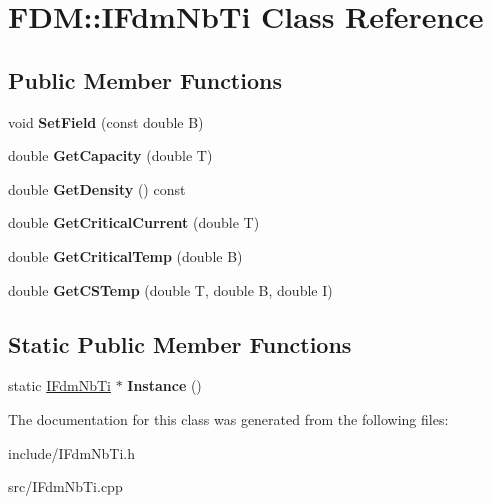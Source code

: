 \hypertarget{class_f_d_m_1_1_i_fdm_nb_ti}{}\section{F\+D\+M\+:\+:I\+Fdm\+Nb\+Ti Class Reference}
\label{class_f_d_m_1_1_i_fdm_nb_ti}
\subsection*{Public Member Functions}
\begin{DoxyCompactItemize}
\item 
\hypertarget{class_f_d_m_1_1_i_fdm_nb_ti_a0a0524a01f02076c36bc751476ee6f0e}{}void {\bfseries Set\+Field} (const double B)\label{class_f_d_m_1_1_i_fdm_nb_ti_a0a0524a01f02076c36bc751476ee6f0e}

\item 
\hypertarget{class_f_d_m_1_1_i_fdm_nb_ti_aa42e8da2ee225cdaebdc315004f35f4c}{}double {\bfseries Get\+Capacity} (double T)\label{class_f_d_m_1_1_i_fdm_nb_ti_aa42e8da2ee225cdaebdc315004f35f4c}

\item 
\hypertarget{class_f_d_m_1_1_i_fdm_nb_ti_a1d7128ebde446a9da776a73ce8a6f1f5}{}double {\bfseries Get\+Density} () const \label{class_f_d_m_1_1_i_fdm_nb_ti_a1d7128ebde446a9da776a73ce8a6f1f5}

\item 
\hypertarget{class_f_d_m_1_1_i_fdm_nb_ti_ae6bda71157da0f3cc47f11ac940b4a8f}{}double {\bfseries Get\+Critical\+Current} (double T)\label{class_f_d_m_1_1_i_fdm_nb_ti_ae6bda71157da0f3cc47f11ac940b4a8f}

\item 
\hypertarget{class_f_d_m_1_1_i_fdm_nb_ti_af81037d7c596c198c005536f66aa0cc0}{}double {\bfseries Get\+Critical\+Temp} (double B)\label{class_f_d_m_1_1_i_fdm_nb_ti_af81037d7c596c198c005536f66aa0cc0}

\item 
\hypertarget{class_f_d_m_1_1_i_fdm_nb_ti_a463babaf3a4105478df879d2a5c27654}{}double {\bfseries Get\+C\+S\+Temp} (double T, double B, double I)\label{class_f_d_m_1_1_i_fdm_nb_ti_a463babaf3a4105478df879d2a5c27654}

\end{DoxyCompactItemize}
\subsection*{Static Public Member Functions}
\begin{DoxyCompactItemize}
\item 
\hypertarget{class_f_d_m_1_1_i_fdm_nb_ti_a38fb031a19fa674e0be709077ce6fd63}{}static \hyperlink{class_f_d_m_1_1_i_fdm_nb_ti}{I\+Fdm\+Nb\+Ti} $\ast$ {\bfseries Instance} ()\label{class_f_d_m_1_1_i_fdm_nb_ti_a38fb031a19fa674e0be709077ce6fd63}

\end{DoxyCompactItemize}


The documentation for this class was generated from the following files\+:\begin{DoxyCompactItemize}
\item 
include/I\+Fdm\+Nb\+Ti.\+h\item 
src/I\+Fdm\+Nb\+Ti.\+cpp\end{DoxyCompactItemize}
